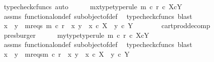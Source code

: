 \begin{isabellebody}
\ {\isacharparenleft}{\kern0pt}typecheck{\isacharunderscore}{\kern0pt}cfuncs{\isacharcomma}{\kern0pt}\ auto{\isacharparenright}{\kern0pt}\isanewline
\ \ \ \ \isamarkupfalse%
\ mx{\isacharunderscore}{\kern0pt}type{\isacharbrackleft}{\kern0pt}type{\isacharunderscore}{\kern0pt}rule{\isacharbrackright}{\kern0pt}{\isacharcolon}{\kern0pt}\ {\isachardoublequoteopen}m\ {\isasymcirc}\isactrlsub c\ r{}\ {\isasymin}\isactrlsub c\ X{\isasymtimes}\isactrlsub cY{\isachardoublequoteclose}\isanewline
\ \ \ \ \ \ \isamarkupfalse%
\ assms\ functional{\isacharunderscore}{\kern0pt}on{\isacharunderscore}{\kern0pt}def\ subobject{\isacharunderscore}{\kern0pt}of{\isacharunderscore}{\kern0pt}def{}\ \isamarkupfalse%
\ {\isacharparenleft}{\kern0pt}typecheck{\isacharunderscore}{\kern0pt}cfuncs{\isacharcomma}{\kern0pt}\ blast{\isacharparenright}{\kern0pt}\isanewline
\ \ \ \ \isamarkupfalse%
\ \isamarkupfalse%
\ x{}\ \ y{}\ \ m{}r{}{\isacharunderscore}{\kern0pt}eqs{\isacharcolon}{\kern0pt}\ {\isachardoublequoteopen}m\ {\isasymcirc}\isactrlsub c\ r{}\ {\isacharequal}{\kern0pt}\ {\isasymlangle}x{}{\isacharcomma}{\kern0pt}\ y{}{\isasymrangle}\ {\isasymand}\ x{}\ {\isasymin}\isactrlsub c\ X\ {\isasymand}\ y{}\ {\isasymin}\isactrlsub c\ Y{\isachardoublequoteclose}\isanewline
\ \ \ \ \ \ \isamarkupfalse%
\ cart{\isacharunderscore}{\kern0pt}prod{\isacharunderscore}{\kern0pt}decomp\ \isamarkupfalse%
\ presburger\isanewline
\ \ \ \ \isamarkupfalse%
\ my{\isacharunderscore}{\kern0pt}type{\isacharbrackleft}{\kern0pt}type{\isacharunderscore}{\kern0pt}rule{\isacharbrackright}{\kern0pt}{\isacharcolon}{\kern0pt}\ {\isachardoublequoteopen}m\ {\isasymcirc}\isactrlsub c\ r{}\ {\isasymin}\isactrlsub c\ X{\isasymtimes}\isactrlsub cY{\isachardoublequoteclose}\isanewline
\ \ \ \ \ \ \isamarkupfalse%
\ assms\ functional{\isacharunderscore}{\kern0pt}on{\isacharunderscore}{\kern0pt}def\ subobject{\isacharunderscore}{\kern0pt}of{\isacharunderscore}{\kern0pt}def{}\ \isamarkupfalse%
\ {\isacharparenleft}{\kern0pt}typecheck{\isacharunderscore}{\kern0pt}cfuncs{\isacharcomma}{\kern0pt}\ blast{\isacharparenright}{\kern0pt}\isanewline
\ \ \ \ \isamarkupfalse%
\ \isamarkupfalse%
\ x{}\ \ y{}\ \ m{}r{}{\isacharunderscore}{\kern0pt}eqs{\isacharcolon}{\kern0pt}{\isachardoublequoteopen}m\ {\isasymcirc}\isactrlsub c\ r{}\ {\isacharequal}{\kern0pt}\ {\isasymlangle}x{}{\isacharcomma}{\kern0pt}\ y{}{\isasymrangle}\ {\isasymand}\ x{}\ {\isasymin}\isactrlsub c\ X\ {\isasymand}\ y{}\ {\isasymin}\isactrlsub c\ Y{\isachardoublequoteclose}\isanewline

\end{isabellebody}
